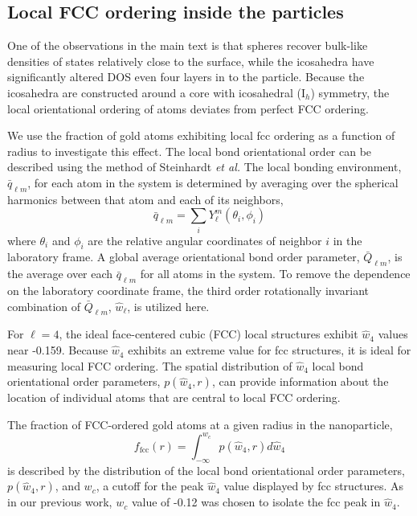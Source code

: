 \documentclass[journal = jpccck, manuscript = suppinfo]{achemso}
\begin{document}
\subsection{Local FCC ordering inside the particles}
One of the observations in the main text is that spheres recover
bulk-like densities of states relatively close to the surface, while
the icosahedra have significantly altered DOS even four layers in to
the particle. Because the icosahedra are constructed around a core
with icosahedral ($\mathrm{I}_h$) symmetry, the local orientational
ordering of atoms deviates from perfect FCC ordering.

We use the fraction of gold atoms exhibiting local fcc ordering as a
function of radius to investigate this effect.  The local bond
orientational order can be described using the method of Steinhardt
\textit{et al.}\cite{Steinhardt1983} The local bonding environment,
$\bar{q}_{\ell m}$, for each atom in the system is determined by
averaging over the spherical harmonics between that atom and each of
its neighbors,
\begin{equation}
\bar{q}_{\ell m} = \sum_i Y_\ell^m(\theta_i, \phi_i)
\end{equation}
where $\theta_i$ and $\phi_i$ are the relative angular coordinates of
neighbor $i$ in the laboratory frame.  A global average orientational
bond order parameter, $\bar{Q}_{\ell m}$, is the average over each
$\bar{q}_{\ell m}$ for all atoms in the system. To remove the
dependence on the laboratory coordinate frame, the third order
rotationally invariant combination of $\bar{Q}_{\ell m}$,
$\hat{w}_\ell$, is utilized here.\cite{Steinhardt1983,Vardeman:2008fk}

For $\ell=4$, the ideal face-centered cubic (FCC) local structures
exhibit $\hat{w}_4$ values near -0.159. Because $\hat{w}_4$ exhibits
an extreme value for fcc structures, it is ideal for measuring local
FCC ordering. The spatial distribution of $\hat{w}_4$ local bond
orientational order parameters, $p(\hat{w}_4 , r)$, can provide
information about the location of individual atoms that are central to
local FCC ordering.

The fraction of FCC-ordered gold atoms at a given radius in the
nanoparticle,
\begin{equation}
        f_\mathrm{fcc}(r) = \int_{-\infty}^{w_c} p(\hat{w}_4, r) d \hat{w}_4
\end{equation}
is described by the distribution of the local bond orientational order
parameters, $p(\hat{w}_4, r)$, and $w_c$, a cutoff for the peak
$\hat{w}_4$ value displayed by fcc structures. As in our previous
work,\cite{Stocker2016} $w_c$ value of -0.12 was chosen to isolate the
fcc peak in $\hat{w}_4$.
\end{document}
